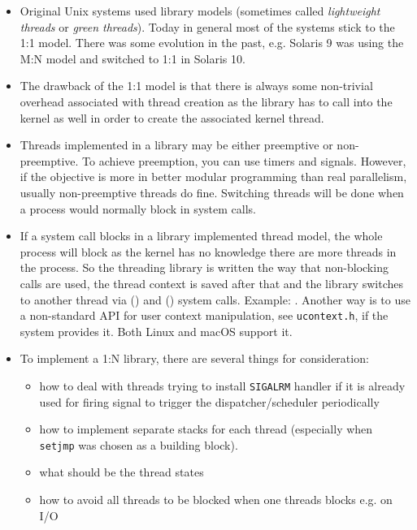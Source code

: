 \begin{itemize}
\item Original Unix systems used library models (sometimes called
\emph{lightweight threads} or \emph{green threads}). Today in general
most of the systems stick to the 1:1 model. There was some evolution in
the past, e.g. Solaris 9 was using the M:N model and switched to 1:1 in
Solaris 10.
\item The drawback of the 1:1 model is that there is always some non-trivial
overhead associated with thread creation as the library has to call into the
kernel as well in order to create the associated kernel thread.
\item Threads implemented in a library may be either preemptive or
non-pre\-emp\-tive. To achieve preemption, you can use timers and signals.
However, if the objective is more in better modular programming than real
parallelism, usually non-preemptive threads do fine.  Switching threads will be
done when a process would normally block in system calls.
\item \label{SETJMP} If a system call blocks in a library implemented thread
model, the whole process will block as the kernel has no knowledge there are
more threads in the process.  So the threading library is written the way that
non-blocking calls are used, the thread context is saved after that and the
library switches to another thread via () and ()
system calls.  Example: .  Another way is to use a
non-standard API for user context manipulation, see \texttt{ucontext.h}, if the
system provides it.  Both Linux and macOS support it.
\item To implement a 1:N library, there are several things for consideration:
\begin{itemize}
\item how to deal with threads trying to install \texttt{SIGALRM} handler
if it is already used for firing signal to trigger the dispatcher/scheduler
periodically
\item how to implement separate stacks for each thread (especially when
\texttt{setjmp} was chosen as a building block).
\item what should be the thread states
\item how to avoid all threads to be blocked when one threads blocks e.g. on I/O
\end{itemize}
\end{itemize}

